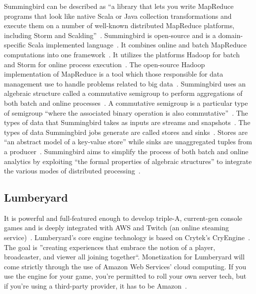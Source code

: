 Summingbird can be described as ``a library that lets you write
MapReduce programs that look like native Scala or Java collection
transformations and execute them on a number of well-known distributed
MapReduce platforms, including Storm and
Scalding''~\cite{summingbirdgit}. Summingbird is open-source and is a
domain-specific Scala implemented
language~\cite{boykin2014summingbird}. It combines online and batch
MapReduce computations into one
framework~\cite{boykin2014summingbird}. It utilizes the platforms
Hadoop for batch and Storm for online process
execution~\cite{boykin2014summingbird}. The open-source Hadoop
implementation of MapReduce is a tool which those responsible for data
management use to handle problems related to big
data~\cite{boykin2014summingbird}. Summingbird uses an algebraic
structure called a commutative semigroup to perform aggregations of
both batch and online processes~\cite{boykin2014summingbird}. A
commutative semigroup is a particular type of semigroup ``where the
associated binary operation is also
commutative''~\cite{boykin2014summingbird}.  The types of data that
Summingbird takes as inputs are streams and
snapshots~\cite{boykin2014summingbird}. The types of data Summingbird
jobs generate are called stores and
sinks~\cite{boykin2014summingbird}. Stores are ``an abstract model of
a key-value store'' while sinks are unaggregated tuples from a
producer~\cite{boykin2014summingbird}. Summingbird aims to simplify
the process of both batch and online analytics by exploiting ``the
formal properties of algebraic structures'' to integrate the various
modes of distributed processing~\cite{boykin2014summingbird}.

     \pv
	   
\subsection{Lumberyard}
     
It is powerful and full-featured enough to develop triple-A,
current-gen console games and is deeply integrated with AWS and Twitch
(an online steaming service)~\cite{gamasutra}. Lumberyard's core
engine technology is based on Crytek's CryEngine~\cite{hands}. The
goal is ''creating experiences that embrace the notion of a player,
broadcaster, and viewer all joining
together``\cite{gamasutra}. Monetization for Lumberyard will come
strictly through the use of Amazon Web Services' cloud computing. If
you use the engine for your game, you're permitted to roll your own
server tech, but if you're using a third-party provider, it has to be
Amazon~\cite{what}.

